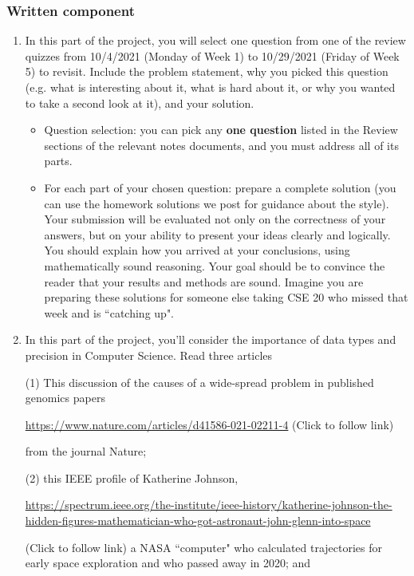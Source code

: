 \documentclass[12pt, oneside]{article}
\begin{document}
\subsubsection*{Written component}
\begin{enumerate}
\item In this part of the project, you will select one question from one of the review quizzes 
from 10/4/2021 (Monday of Week 1) to 10/29/2021 (Friday of Week 5) to revisit. 
Include the problem statement, why you picked this question (e.g. what is interesting about it, 
what is hard about it, or why you wanted to take a second look at it), and your solution. 
    \begin{itemize}
        \item Question selection: you can pick any {\bf one question} listed in the Review 
        sections of the relevant notes documents, and you must address all of its parts.
        \item For each part of your chosen question: prepare a complete solution 
        (you can use the homework solutions we post for guidance about the style). 
        Your submission will be evaluated not only on the correctness of your answers, 
        but on your ability to present your ideas clearly and logically. 
        You should explain how you arrived at your conclusions, using mathematically 
        sound reasoning. Your goal should be to convince the reader that your results 
        and methods are sound. Imagine you are preparing these solutions for someone else 
        taking CSE 20 who missed that week and is ``catching up".
    \end{itemize}
\item In this part of the project, you'll consider the importance of data types
and precision in Computer Science. 
Read three articles

(1) This discussion of the causes of a wide-spread problem in published genomics papers

\url{https://www.nature.com/articles/d41586-021-02211-4} (Click to follow link)

from the journal Nature; 

(2) this IEEE profile of Katherine Johnson, 

{\tiny \url{https://spectrum.ieee.org/the-institute/ieee-history/katherine-johnson-the-hidden-figures-mathematician-who-got-astronaut-john-glenn-into-space}}

(Click to follow link) a NASA ``computer" who calculated trajectories for 
early space exploration and who passed away in 2020; and 


\end{enumerate}
\end{document}
